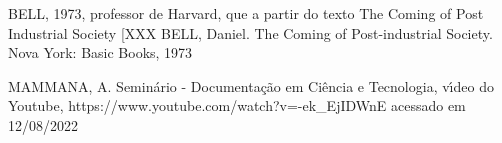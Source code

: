 \documentclass[
12pt,		%
openright,	%
twoside,  %
a4paper,			%
chapter=TITLE,		%
english,			%
french,				%
spanish,			%
brazil				%
]{USPSC-classe/USPSC}
\begin{document}
\begin{flushleft}
\begin{flushleft}
\begin{flushleft}
\begin{flushleft}
\begin{flushleft}
\begin{flushleft}
\begin{flushleft}
\begin{flushleft}
\begin{flushleft}
[BELL, 1973]  BELL, 1973, professor de Harvard, que a partir do texto The Coming of Post Industrial Society [XXX BELL, Daniel. The Coming of Post-industrial Society. Nova York: Basic Books, 1973
\end{flushleft}


\end{flushleft}


\end{flushleft}


\end{flushleft}


\end{flushleft}


\end{flushleft}


\end{flushleft}


\end{flushleft}


\end{flushleft}


\begin{flushleft}
\begin{flushleft}
\begin{flushleft}
\begin{flushleft}
\begin{flushleft}
\begin{flushleft}
\begin{flushleft}
\begin{flushleft}
\begin{flushleft}
[MAMMANA, 2020] MAMMANA, A. Semin\'ario - Documenta\c{c}\~ao em Ci\^encia e Tecnologia, v\'{\i}deo do Youtube, https://www.youtube.com/watch?v=-ek\_EjIDWnE acessado em 12/08/2022
\end{flushleft}


\end{flushleft}


\end{flushleft}


\end{flushleft}


\end{flushleft}


\end{flushleft}


\end{flushleft}


\end{flushleft}


\end{flushleft}
\end{document}
